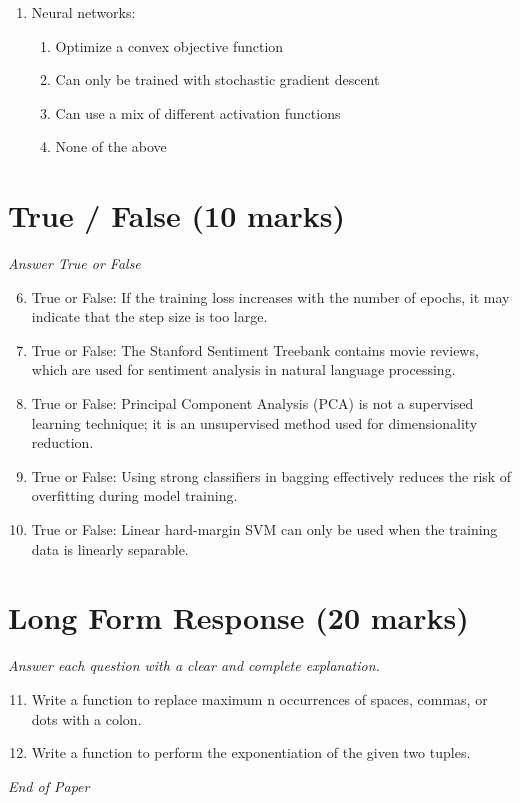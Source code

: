 \documentclass[12pt]{article}
\begin{document}
\begin{enumerate}[label=\arabic*.]
\begin{enumerate}[label=(\alph*)]
    \item The use of prior distributions on the parameters in a probabilistic model.
    \item The use of class priors in Gaussian Discriminant Analysis.
\end{enumerate}
\item Neural networks:
\begin{enumerate}[label=(\alph*)]
    \item Optimize a convex objective function
    \item Can only be trained with stochastic gradient descent
    \item Can use a mix of different activation functions
    \item None of the above
\end{enumerate}
\end{enumerate}

\section*{True / False (10 marks)}
\textit{Answer True or False}
\begin{enumerate}[label=\arabic*.]
\setcounter{enumi}{5}
\item True or False: If the training loss increases with the number of epochs, it may indicate that the step size is too large.
\item True or False: The Stanford Sentiment Treebank contains movie reviews, which are used for sentiment analysis in natural language processing.
\item True or False: Principal Component Analysis (PCA) is not a supervised learning technique; it is an unsupervised method used for dimensionality reduction.
\item True or False: Using strong classifiers in bagging effectively reduces the risk of overfitting during model training.
\item True or False: Linear hard-margin SVM can only be used when the training data is linearly separable.
\end{enumerate}

\section*{Long Form Response (20 marks)}
\textit{Answer each question with a clear and complete explanation.}
\begin{enumerate}[label=\arabic*.]
\setcounter{enumi}{10}
\item Write a function to replace maximum n occurrences of spaces, commas, or dots with a colon.
\item Write a function to perform the exponentiation of the given two tuples.
\end{enumerate}

\vfill
\noindent\textit{End of Paper}
\end{document}
